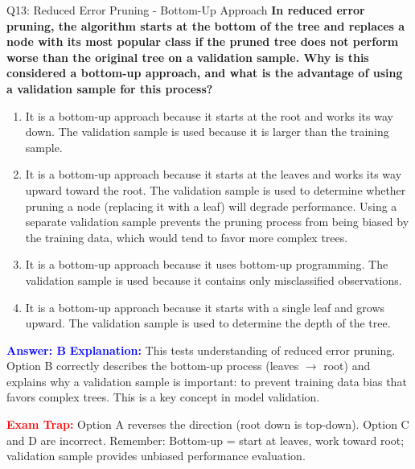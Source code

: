 \documentclass[8pt]{beamer}
\begin{document}
	\begin{frame}{Q13: Reduced Error Pruning - Bottom-Up Approach}
		\fontsize{6.5}{7.5}\selectfont
		\textbf{In reduced error pruning, the algorithm starts at the bottom of the tree and replaces a node with its most popular class if the pruned tree does not perform worse than the original tree on a validation sample. Why is this considered a bottom-up approach, and what is the advantage of using a validation sample for this process?}
		
		\begin{enumerate}
			\item It is a bottom-up approach because it starts at the root and works its way down. The validation sample is used because it is larger than the training sample.
			\item It is a bottom-up approach because it starts at the leaves and works its way upward toward the root. The validation sample is used to determine whether pruning a node (replacing it with a leaf) will degrade performance. Using a separate validation sample prevents the pruning process from being biased by the training data, which would tend to favor more complex trees.
			\item It is a bottom-up approach because it uses bottom-up programming. The validation sample is used because it contains only misclassified observations.
			\item It is a bottom-up approach because it starts with a single leaf and grows upward. The validation sample is used to determine the depth of the tree.
		\end{enumerate}
		
		\vspace{0.1cm}
		\textcolor{blue}{\textbf{Answer: B}}
		\vspace{0.1cm}
		\textcolor{blue}{\textbf{Explanation:}} This tests understanding of reduced error pruning. Option B correctly describes the bottom-up process (leaves $\rightarrow$ root) and explains why a validation sample is important: to prevent training data bias that favors complex trees. This is a key concept in model validation.
		
		\textcolor{red}{\textbf{Exam Trap:}} Option A reverses the direction (root down is top-down). Option C and D are incorrect. Remember: Bottom-up = start at leaves, work toward root; validation sample provides unbiased performance evaluation.
	\end{frame}
	
\end{document}
